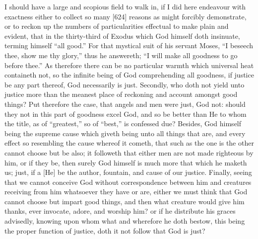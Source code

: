 I should have a large and scopious field to walk in, if I did here endeavour with exactness either to collect so many [624] reasons as might forcibly demonstrate, or to reckon up the numbers of particularities effectual to make plain and evident, that in the thirty-third of Exodus which God himself doth insinuate, terming himself “all good.” For that mystical suit of his servant Moses, “I beseech thee, show me thy glory,” thus he answereth; “I will make all goodness to go before thee.” As therefore there can be no particular warmth which universal heat containeth not, so the infinite being of God comprehending all goodness, if justice be any part thereof, God necessarily is just. Secondly, who doth not yield unto justice more than the meanest place of reckoning and account amongst good things? Put therefore the case, that angels and men were just, God not: should they not in this part of goodness excel God, and so be better than He to whom the title, as of “greatest,” so of “best,” is confessed due? Besides, God himself being the supreme cause which giveth being unto all things that are, and every effect so resembling the cause whereof it cometh, that such as the one is the other cannot choose but be also; it followeth that either men are not made righteous by him, or if they be, then surely God himself is much more that which he maketh us; just, if a [He] be the author, fountain, and cause of our justice. Finally, seeing that we cannot conceive God without correspondence between him and creatures receiving from him whatsoever they have or are, either we must think that God cannot choose but impart good things, and then what creature would give him thanks, ever invocate, adore, and worship him? or if he distribute his graces advisedly, knowing upon whom what and wherefore he doth bestow, this being the proper function of justice, doth it not follow that God is just?

